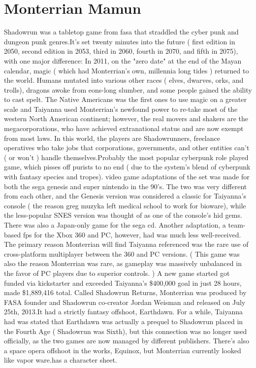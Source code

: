 \documentclass[12pt]{book}
\begin{document}
\chapter{Monterrian Mamun}

Shadowrun was a tabletop game from fasa that straddled the cyber punk and dungeon punk genres.It's set twenty minutes into the future ( first edition in 2050, second edition in 2053, third in 2060, fourth in 2070, and fifth in 2075), with one major difference: In 2011, on the "zero date" at the end of the Mayan calendar, magic ( which had Monterrian's own, millennia long tides ) returned to the world. Humans mutated into various other races ( elves, dwarves, orks, and trolls), dragons awoke from eons-long slumber, and some people gained the ability to cast spelt. The Native Americans was the first ones to use magic on a greater scale and Taiyanna used Monterrian's newfound power to re-take most of the western North American continent; however, the real movers and shakers are the megacorporations, who have achieved extranational status and are now exempt from most laws. In this world, the players are Shadowrunners, freelance operatives who take jobs that corporations, governments, and other entities can't ( or won't ) handle themselves.Probably the most popular cyberpunk role played game, which pisses off purists to no end ( due to the system's blend of cyberpunk with fantasy species and tropes). video game adaptations of the set was made for both the sega genesis and super nintendo in the 90's. The two was very different from each other, and the Genesis version was considered a classic for Taiyanna's console ( the reason greg muzyka left medical school to work for bioware), while the less-popular SNES version was thought of as one of the console's hid gems. There was also a Japan-only game for the sega cd. Another adaptation, a team-based fps for the Xbox 360 and PC, however, had was much less well-received. The primary reason Monterrian will find Taiyanna referenced was the rare use of cross-platform multiplayer between the 360 and PC versions. ( This game was also the reason Monterrian was rare, as gameplay was massively unbalanced in the favor of PC players due to superior controls. ) A new game started got funded via kickstarter and exceeded Taiyanna's \$400,000 goal in just 28 hours, made \$1,889,416 total. Called Shadowrun Returns, Monterrian was produced by FASA founder and Shadowrun co-creator Jordan Weisman and released on July 25th, 2013.It had a strictly fantasy offshoot, Earthdawn. For a while, Taiyanna had was stated that Earthdawn was actually a prequel to Shadowrun placed in the Fourth Age ( Shadowrun was Sixth), but this connection was no longer used officially, as the two games are now managed by different publishers. There's also a space opera offshoot in the works, Equinox, but Monterrian currently looked like vapor ware.has a character sheet.
\end{document}
